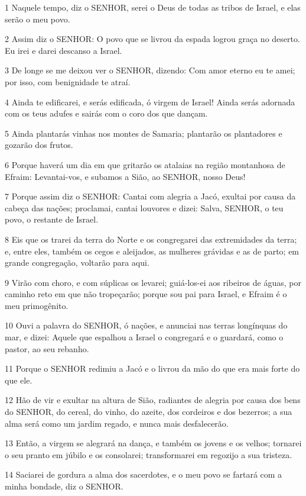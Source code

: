 \par 1 Naquele tempo, diz o SENHOR, serei o Deus de todas as tribos de Israel, e elas serão o meu povo.
\par 2 Assim diz o SENHOR: O povo que se livrou da espada logrou graça no deserto. Eu irei e darei descanso a Israel.
\par 3 De longe se me deixou ver o SENHOR, dizendo: Com amor eterno eu te amei; por isso, com benignidade te atraí.
\par 4 Ainda te edificarei, e serás edificada, ó virgem de Israel! Ainda serás adornada com os teus adufes e sairás com o coro dos que dançam.
\par 5 Ainda plantarás vinhas nos montes de Samaria; plantarão os plantadores e gozarão dos frutos.
\par 6 Porque haverá um dia em que gritarão os atalaias na região montanhosa de Efraim: Levantai-vos, e subamos a Sião, ao SENHOR, nosso Deus!
\par 7 Porque assim diz o SENHOR: Cantai com alegria a Jacó, exultai por causa da cabeça das nações; proclamai, cantai louvores e dizei: Salva, SENHOR, o teu povo, o restante de Israel.
\par 8 Eis que os trarei da terra do Norte e os congregarei das extremidades da terra; e, entre eles, também os cegos e aleijados, as mulheres grávidas e as de parto; em grande congregação, voltarão para aqui.
\par 9 Virão com choro, e com súplicas os levarei; guiá-los-ei aos ribeiros de águas, por caminho reto em que não tropeçarão; porque sou pai para Israel, e Efraim é o meu primogênito.
\par 10 Ouvi a palavra do SENHOR, ó nações, e anunciai nas terras longínquas do mar, e dizei: Aquele que espalhou a Israel o congregará e o guardará, como o pastor, ao seu rebanho.
\par 11 Porque o SENHOR redimiu a Jacó e o livrou da mão do que era mais forte do que ele.
\par 12 Hão de vir e exultar na altura de Sião, radiantes de alegria por causa dos bens do SENHOR, do cereal, do vinho, do azeite, dos cordeiros e dos bezerros; a sua alma será como um jardim regado, e nunca mais desfalecerão.
\par 13 Então, a virgem se alegrará na dança, e também os jovens e os velhos; tornarei o seu pranto em júbilo e os consolarei; transformarei em regozijo a sua tristeza.
\par 14 Saciarei de gordura a alma dos sacerdotes, e o meu povo se fartará com a minha bondade, diz o SENHOR.

